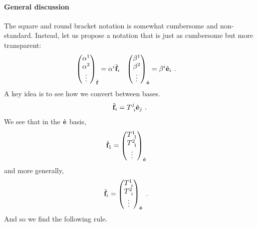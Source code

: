 \paragraph{General discussion} The square and round bracket notation is somewhat cumbersome and non-standard. Instead, let us propose a notation that is just as cumbersome but more transparent:
\begin{align}
    \begin{pmatrix}
        \alpha^1\\
        \alpha^2\\
        \vdots
    \end{pmatrix}_{\hat{\mathbf{f}}}
    &= \alpha^i \hat{\mathbf{f}}_i
    &
    \begin{pmatrix}
        \beta^1\\
        \beta^2\\
        \vdots
    \end{pmatrix}_{\hat{\mathbf{e}}}
    &= \beta^i \hat{\mathbf{e}}_i \ .
\end{align}
A key idea is to see how we convert between bases.
\begin{align}
    \bas{f}_i = T\aij{j}{i} \bas{e}_j \ .
    \label{eq:change:of:basis:matrix:1}
\end{align}
We see that in the $\hat{\mathbf{e}}$ basis,
\begin{align}
    \bas{f}_1 &=
    \begin{pmatrix}
        T\aij{1}{1}
        \\
        T\aij{2}{1}
        \\
        \vdots
    \end{pmatrix}_{\bas{e}}
\end{align}
and more generally,
\begin{align}
    \bas{f}_i &=
    \begin{pmatrix}
        T\aij{1}{i}
        \\
        T\aij{2}{i}
        \\
        \vdots
    \end{pmatrix}_{\bas{e}} \ .
\end{align}
And so we find the following rule.
